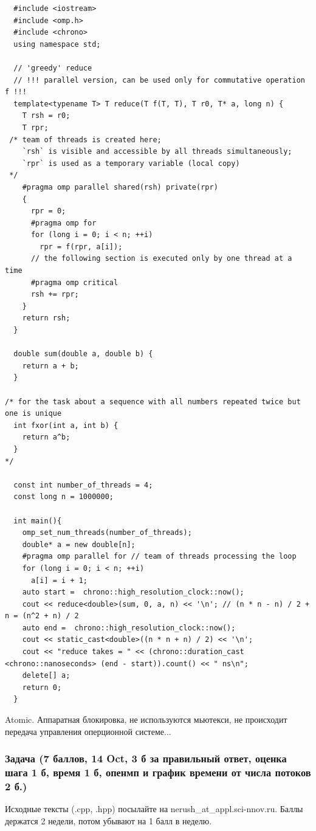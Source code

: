 \documentclass{book}
\begin{document}
\begin{verbatim}
  #include <iostream>
  #include <omp.h>
  #include <chrono>
  using namespace std;

  // 'greedy' reduce
  // !!! parallel version, can be used only for commutative operation f !!!
  template<typename T> T reduce(T f(T, T), T r0, T* a, long n) {
    T rsh = r0;
    T rpr;
 /* team of threads is created here;
    `rsh` is visible and accessible by all threads simultaneously;
    `rpr` is used as a temporary variable (local copy)
 */
    #pragma omp parallel shared(rsh) private(rpr)
    {
      rpr = 0;
      #pragma omp for
      for (long i = 0; i < n; ++i)
        rpr = f(rpr, a[i]);
      // the following section is executed only by one thread at a time
      #pragma omp critical
      rsh += rpr;
    }
    return rsh;
  }

  double sum(double a, double b) {
    return a + b;
  }

/* for the task about a sequence with all numbers repeated twice but one is unique
  int fxor(int a, int b) {
    return a^b;
  }
*/

  const int number_of_threads = 4;
  const long n = 1000000;

  int main(){
    omp_set_num_threads(number_of_threads);
    double* a = new double[n];
    #pragma omp parallel for // team of threads processing the loop
    for (long i = 0; i < n; ++i)
      a[i] = i + 1;
    auto start =  chrono::high_resolution_clock::now();
    cout << reduce<double>(sum, 0, a, n) << '\n'; // (n * n - n) / 2 + n = (n^2 + n) / 2
    auto end =  chrono::high_resolution_clock::now();
    cout << static_cast<double>((n * n + n) / 2) << '\n';
    cout << "reduce takes = " << (chrono::duration_cast <chrono::nanoseconds> (end - start)).count() << " ns\n";
    delete[] a;
    return 0;
  }
\end{verbatim}

Atomic. Аппаратная блокировка, не используются мьютекси, не происходит передача управления оперционной системе...

\subsubsection{Задача (7 баллов, 14 Oct, 3 б за правильный ответ, оценка шага 1 б, время 1 б,
опенмп и график времени от числа потоков 2 б.)}

Исходные тексты (.cpp, .hpp) посылайте на nerush\_at\_appl.sci-nnov.ru. Баллы
держатся 2 недели, потом убывают на 1 балл в неделю.
\end{document}
